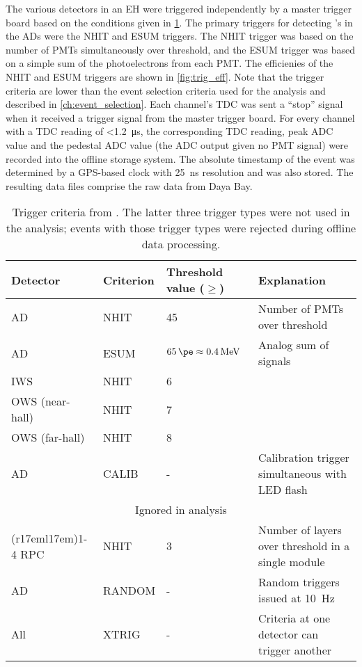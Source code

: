The various detectors in an EH were triggered independently
by a master trigger board based on the conditions given in \cref{tab:trigger}.
The primary triggers for detecting \nuebar{}'s in the ADs were the NHIT and ESUM triggers.
The NHIT trigger was based on the number of PMTs simultaneously over threshold,
and the ESUM trigger was based on a simple sum of the photoelectrons
from each PMT.
The efficienies of the NHIT and ESUM triggers are shown in \cref{fig:trig_eff}.
Note that the trigger criteria are lower than the event selection
criteria used for the \thetaot{} analysis and described in \cref{ch:event_selection}.
Each channel's TDC was sent a ``stop'' signal when it received a trigger signal
from the master trigger board.
For every channel with a TDC reading of \SI{<1.2}{\us},
the corresponding TDC reading, peak ADC value and the pedestal ADC value
(the ADC output given no PMT signal)
were recorded into the offline storage system.
The absolute timestamp of the event was determined by a GPS-based clock
with \SI{25}{\ns} resolution and was also stored.
The resulting data files comprise the raw data from Daya Bay.


\begin{table}[ht]
    \centering
    \begin{tabular}[t]{lllp{6cm}}
        \toprule
        Detector & Criterion & Threshold value ($\geq$) & Explanation\\
        \midrule
        AD & NHIT & \num{45} & Number of PMTs over threshold \\
        AD & ESUM & $\SI{65}{\pe}\approx \SI{0.4}{\MeV}$ & Analog sum of signals \\
        IWS & NHIT & \num{6} & \\
        OWS (near-hall) & NHIT & \num{7} & \\
        OWS (far-hall) & NHIT & \num{8} & \\
        AD & CALIB & - & Calibration trigger simultaneous with LED flash \\
        \midrule
        \multicolumn{4}{c}{Ignored in \thetaot{} analysis} \\
        \cmidrule(r{17em}l{17em}){1-4}
        RPC & NHIT & \num{3} & Number of layers over threshold in a single module \\
        AD & RANDOM & - & Random triggers issued at \SI{10}{\Hz} \\
        All & XTRIG & - & Criteria at one detector can trigger another \\
        \bottomrule
    \end{tabular}
    \caption[Trigger criteria]{
        Trigger criteria from \cite{ngd2016}.
        The latter three trigger types were not used in the \thetaot{} analysis;
        events with those trigger types were rejected
        during offline data processing.
    }
    \label{tab:trigger}
\end{table}

